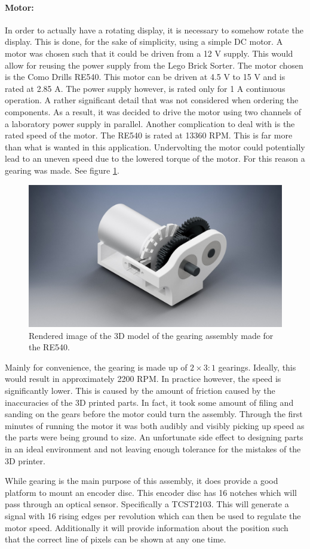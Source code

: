 \paragraph{Motor:}
In order to actually have a rotating display, it is necessary to somehow rotate the display.
This is done, for the sake of simplicity, using a simple DC motor.
A motor was chosen such that it could be driven from a 12 V supply.
This would allow for reusing the power supply from the Lego Brick Sorter.
The motor chosen is the Como Drills RE540.
This motor can be driven at 4.5 V to 15 V and is rated at 2.85 A.
The power supply however, is rated only for 1 A continuous operation.
A rather significant detail that was not considered when ordering the components.
As a result, it was decided to drive the motor using two channels of a laboratory power supply in parallel.
Another complication to deal with is the rated speed of the motor.
The RE540 is rated at 13360 RPM.
This is far more than what is wanted in this application.
Undervolting the motor could potentially lead to an uneven speed due to the lowered torque of the motor.
For this reason a gearing was made.
See figure \ref{fig:gearing}.
\begin{figure}[H]
	\centering
	\includegraphics[trim={10cm 0 10cm 0},clip,width=.6\linewidth]{images/gearing}
	\caption{Rendered image of the 3D model of the gearing assembly made for the RE540.}
	\label{fig:gearing}
\end{figure}
Mainly for convenience, the gearing is made up of $2\times3:1$ gearings.
Ideally, this would result in approximately 2200 RPM.
In practice however, the speed is significantly lower.
This is caused by the amount of friction caused by the inaccuracies of the 3D printed parts.
In fact, it took some amount of filing and sanding on the gears before the motor could turn the assembly.
Through the first minutes of running the motor it was both audibly and visibly picking up speed as the parts were being ground to size.
An unfortunate side effect to designing parts in an ideal environment and not leaving enough tolerance for the mistakes of the 3D printer.

While gearing is the main purpose of this assembly, it does provide a good platform to mount an encoder disc.
This encoder disc has 16 notches which will pass through an optical sensor. 
Specifically a TCST2103.
This will generate a signal with 16 rising edges per revolution which can then be used to regulate the motor speed.
Additionally it will provide information about the position such that the correct line of pixels can be shown at any one time.